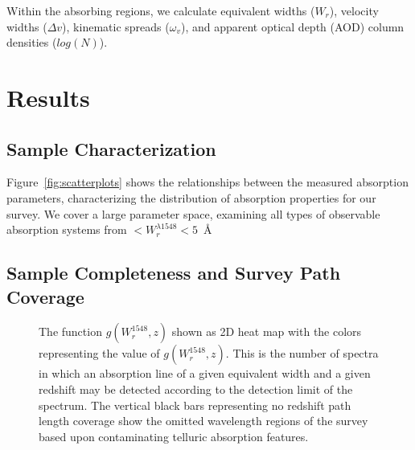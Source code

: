 \documentclass[linenumbers,twocolumn]{aastex61}
\begin{document}
Within the absorbing regions, we calculate equivalent widths ($W_r$), velocity widths ($\Delta v$), kinematic spreads ($\omega_v$), and apparent optical depth (AOD) column densities ($log(N)$).


\section{Results}
\label{sec:results}

\subsection{Sample Characterization}
\label{sec:sample}

\begin{figure*}[bth]
\caption{Correlations between measured absorption properties for survey sample. $\log N$ is the AOD column density, $\omega_v$ is the kinematic spread, $W_r^{1548}$ is the rest frame {} equivalent width, and $z$ is the absorption redshift.}
\label{fig:scatterplots}
\end{figure*}

Figure~\ref{fig:scatterplots} shows the relationships between the measured absorption parameters, characterizing the distribution of absorption properties for our survey. We cover a large parameter space, examining all types of observable absorption systems from $ < W_r^{\lambda1548} < 5$~{\AA}

\subsection{Sample Completeness and Survey Path Coverage}

\begin{figure}[bth]
\caption{The function $g(W_r^{1548}, z)$ shown as 2D heat map with the colors representing the value of $g(W_r^{1548}, z)$. This is the number of spectra in which an absorption line of a given equivalent width and a given redshift may be detected according to the detection limit of the spectrum. The vertical black bars representing no redshift path length coverage show the omitted wavelength regions of the survey based upon contaminating telluric absorption features.}
\label{fig:gwz}
\end{figure}
\end{document}
